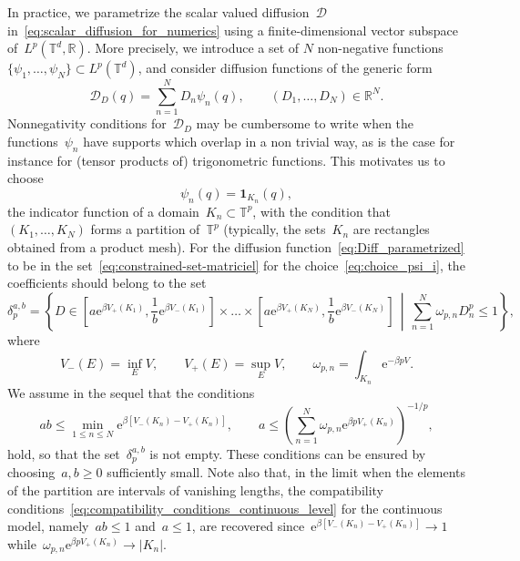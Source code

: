 \documentclass{article}
\newcommand{\rme}{\mathrm{e}}
\newcommand{\R}{\mathbb{R}}
\renewcommand{\leq}{\leqslant}
\renewcommand{\geq}{\geqslant}
\def\R{\mathbb{R}}
\def\T{\mathbb{T}}
\newcommand{\Df}{\mathscr{D}}
\newcommand{\diff}{D}
\newcommand{\diffset}{\delta}
\renewcommand{\dim}{d}
\begin{document}
In practice, we parametrize the scalar valued diffusion~$\Df$ in~\eqref{eq:scalar_diffusion_for_numerics} using a finite-dimensional vector subspace of~$L^p(\T^\dim,\R)$. More precisely, we introduce a set of $N$ non-negative functions $\{\psi_1,\ldots, \psi_N\} \subset L^p(\T^\dim)$, and consider diffusion functions of the generic form
\begin{equation}
  \label{eq:Diff_parametrized}
  \Df_\diff(q) = \sum_{n=1}^N \diff_n \psi_n(q), \qquad (\diff_1,\ldots, \diff_N)\in\R^N.
\end{equation}
Nonnegativity conditions for~$\Df_\diff$ may be cumbersome to write when the functions~$\psi_n$ have supports which overlap in a non trivial way, as is the case for instance for (tensor products of) trigonometric functions. This motivates us to choose
\begin{equation}
  \label{eq:choice_psi_i}
  \psi_n(q) = \mathbf{1}_{K_n}(q),
\end{equation}
the indicator function of a domain~$K_n \subset \T^p$, with the condition that~$(K_1,\ldots,K_N)$ forms a partition of~$\T^p$ (typically, the sets~$K_n$ are rectangles obtained from a product mesh).
For the diffusion function~\eqref{eq:Diff_parametrized} to be in the set~\eqref{eq:constrained-set-matriciel} for the choice~\eqref{eq:choice_psi_i}, the coefficients should belong to the set
\begin{equation}
  \label{eq:def-Dhat}
  \diffset_p^{a,b} = \left\{\diff\in \left[a \rme^{\beta V_+(K_1)},\frac{1}{b}\rme^{\beta V_-(K_1)} \right] \times \dots \times \left[a \rme^{\beta V_+(K_N)},\frac{1}{b}\rme^{\beta V_-(K_N)} \right] \, \middle| \, \sum_{n=1}^N \omega_{p,n} D_n^p \leq 1 \right\},
\end{equation}
where
\[
V_-(E) = \inf_E V, \qquad V_+(E) = \sup_E V, \qquad \omega_{p,n} = \int_{K_n} \rme^{-\beta p V}.
\]
We assume in the sequel that the conditions
\begin{equation}
  \label{eq:condition_ab_partition}
  ab \leq \min_{1 \leq n \leq N} \rme^{\beta [V_-(K_n)-V_+(K_n)]}, \qquad a  \leq \left( \sum_{n=1}^N \omega_{p,n} \rme^{\beta p V_+(K_n)} \right)^{-1/p}, 
\end{equation}
hold, so that the set~$\diffset_p^{a,b}$ is not empty. These conditions can be ensured by choosing~$a,b \geq 0$ sufficiently small. Note also that, in the limit when the elements of the partition are intervals of vanishing lengths, the compatibility conditions~\eqref{eq:compatibility_conditions_continuous_level} for the continuous model, namely~$ab \leq 1$ and~$a \leq 1$, are recovered since~$\rme^{\beta [V_-(K_n)-V_+(K_n)]} \to 1$ while~$\omega_{p,n} \rme^{\beta p V_+(K_n)} \to |K_n|$.
\end{document}
